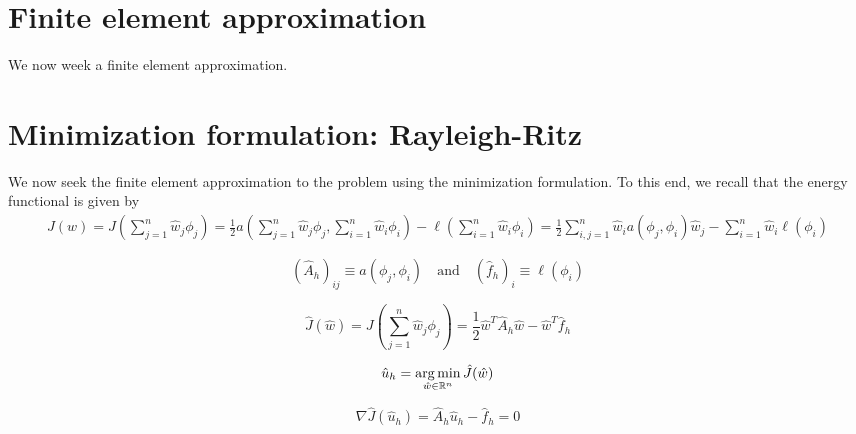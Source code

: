 \section{Finite element approximation}
We now week a finite element approximation.  

\section{Minimization formulation: Rayleigh-Ritz}
We now seek the finite element approximation to the problem using the minimization formulation. To this end, we recall that the energy functional is given by 
\begin{align*}
  J(w) =  J(\sum_{j=1}^n \hat w_j \phi_j)
  = \frac{1}{2} a (\sum_{j=1}^n \hat w_j \phi_j, \sum_{i=1}^n \hat w_i \phi_i) - \ell(\sum_{i=1}^n \hat w_i \phi_i)
  = \frac{1}{2} \sum_{i,j=1}^n \hat w_i a(\phi_j,\phi_i) \hat w_j - \sum_{i=1}^n \hat w_i \ell(\phi_i)
\end{align*}

\begin{equation*}
  (\hat A_h)_{ij} \equiv a(\phi_j,\phi_i)
  \quad \text{and} \quad
  (\hat f_h)_i \equiv \ell(\phi_i)
\end{equation*}

\begin{equation*}
  \hat J(\hat w) = J(\sum_{j=1}^n \hat w_j \phi_j)
  = \frac{1}{2} \hat w^T \hat A_h \hat w - \hat w^T \hat f_h
\end{equation*}

\begin{equation*}
  \hat u_h = \operatorname*{arg\,min}_{\hat w \in \mathbb{R}^n} \hat J(\hat w)
\end{equation*}

\begin{equation*}
  \nabla \hat J(\hat u_h) = \hat A_h \hat u_h - \hat f_h = 0
\end{equation*}
